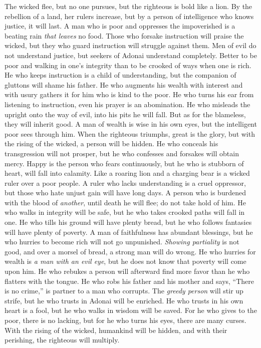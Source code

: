 \begin{biblechapter} %
\verse The wicked flee, but no one pursues, 
but the righteous is bold like a lion.
\verse By the rebellion of a land, her rulers increase, 
but by a person of intelligence who knows justice, it will last.
\verse A man who is poor and oppresses the impoverished 
is a beating rain \textit{that leaves} no food.
\verse Those who forsake instruction will praise the wicked, 
but they who guard instruction will struggle against them.
\verse Men of evil do not understand justice, 
but seekers of Adonai understand completely.
\verse Better to be poor and walking in one’s integrity 
than to be crooked of ways when one is rich.
\verse He who keeps instruction is a child of understanding, 
but the companion of gluttons will shame his father.
\verse He who augments his wealth with interest and with usury 
gathers it for him who is kind to the poor.
\verse He who turns his ear from listening to instruction, 
even his prayer is an abomination.
\verse He who misleads the upright onto the way of evil, 
into his pits he will fall. 
But as for the blameless, they will inherit good.
\verse A man of wealth is wise in his own eyes, 
but the intelligent poor sees through him.
\verse When the righteous triumphs, great is the glory, 
but with the rising of the wicked, a person will be hidden.
\verse He who conceals his transgression will not prosper, 
but he who confesses and forsakes will obtain mercy.
\verse Happy is the person who fears continuously, 
but he who is stubborn of heart, will fall into calamity.
\verse Like a roaring lion and a charging bear 
is a wicked ruler over a poor people.
\verse A ruler who lacks understanding is a cruel oppressor, 
but those who hate unjust gain will have long days.
\verse A person who is burdened with the blood of \textit{another}, 
until death he will flee; 
do not take hold of him.
\verse He who walks in integrity will be safe, 
but he who takes crooked paths will fall in one.
\verse He who tills his ground will have plenty bread, 
but he who follows fantasies will have plenty of poverty.
\verse A man of faithfulness has abundant blessings, 
but he who hurries to become rich will not go unpunished.
\verse \textit{Showing partiality} is not good, 
and over a morsel of bread, a strong man will do wrong.
\verse He who hurries for wealth is \textit{a man with an evil eye}, 
but he does not know that poverty will come upon him.
\verse He who rebukes a person will afterward find more favor 
than he who flatters with the tongue.
\verse He who robs his father and his mother and says, “There is no crime,” 
is partner to a man who corrupts.
\verse The \textit{greedy person} will stir up strife, 
but he who trusts in Adonai will be enriched.
\verse He who trusts in his own heart is a fool, 
but he who walks in wisdom will be saved.
\verse For he who gives to the poor, there is no lacking, 
but for he who turns his eyes, there are many curses.
\verse With the rising of the wicked, humankind will be hidden, 
and with their perishing, the righteous will multiply.
\end{biblechapter}

